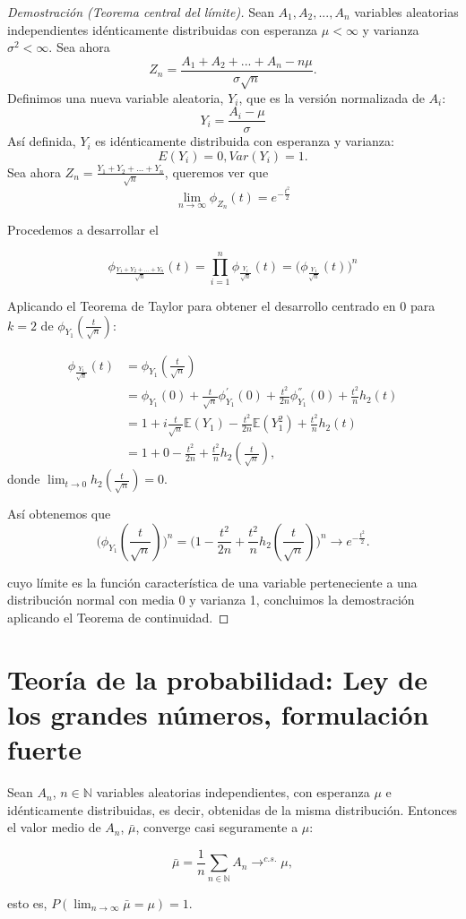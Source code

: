 \documentclass[../proyecto.tex]{memoir}
\begin{document}
\begin{proof}[Demostración (Teorema central del límite)]

Sean $A_{1},A_{2},...,A_{n}$ variables aleatorias independientes idénticamente distribuidas con esperanza $\mu < \infty$ y varianza $\sigma^2< \infty$.
Sea ahora $$
Z_{n} = \frac{A_{1}+A_{2}+...+A_{n}-n\mu }{\sigma \sqrt{n}}.
$$
Definimos una nueva variable aleatoria, $Y_i$, que es la versión normalizada de $A_i$:$$
Y_i=\frac{A_i-\mu}{\sigma}
$$
Así definida, $Y_i$ es idénticamente distribuida con esperanza y varianza: $$
E(Y_{i}) = 0,  Var(Y_{i})=1.
$$
Sea ahora $Z_n = \frac{Y_1+Y_2+...+Y_n}{\sqrt{n}}$, queremos ver que $$
\lim_{n \to \infty} \phi_{Z_{n}}(t)=e^{-\frac{t^{2}}{2}}
$$

Procedemos a desarrollar el

$$
\phi_{\frac{Y_1+Y_2+...+Y_n}{\sqrt{n}}}(t) = \prod_{i=1}^{n} \phi_{\frac{Y_i}{\sqrt{n}}} (t) = \big(\phi_{\frac{Y_1}{\sqrt{n}}}(t) \big)^n
$$

Aplicando el Teorema de Taylor para obtener el desarrollo centrado en 0 para $k=2$ de $\phi_{Y_1}(\frac{t}{\sqrt{n}})$: 

\begin{align*}
\phi_{\frac{Y_1}{\sqrt{n}}}(t) &= \phi_{Y_1}(\frac{t}{\sqrt{n}}) \\
  &= \phi_{Y_1}(0) + \frac{t}{\sqrt{n}}\phi_{Y_1}^{'}(0) + \frac{t^2}{2n}\phi_{Y_1}^{''}(0) + \frac{t^2}{n} h_2(t)\\
 &= 1 + i\frac{t}{\sqrt{n}}\mathds{E}(Y_1) - \frac{t^2}{2n}\mathds{E}(Y_1^2) + \frac{t^2}{n} h_2(t)\\
 &= 1 + 0 - \frac{t^2}{2n} + \frac{t^2}{n} h_2(\frac{t}{\sqrt{n}}),
\end{align*}
donde $\lim_{t\to 0} h_2(\frac{t}{\sqrt{n}}) = 0$.

Así obtenemos que $$
\big(\phi_{Y_1}(\frac{t}{\sqrt{n}}) \big)^n =\big( 1 - \frac{t^2}{2n} + \frac{t^2}{n} h_2(\frac{t}{\sqrt{n}}) \big)^n\longrightarrow e^{-\frac{t^2}{2}}.
$$

cuyo límite es la función característica de una variable perteneciente a una distribución normal con media 0 y varianza 1, concluimos la demostración aplicando el Teorema de continuidad.
\end{proof}

\section{Teoría de la probabilidad: Ley de los grandes números, formulación fuerte}
\begin{teorema}
Sean $A_n$, $n \in \mathds{N}$ variables aleatorias independientes, con esperanza $\mu$ e idénticamente distribuidas, es decir, obtenidas de la misma distribución. Entonces el valor medio de $A_n$, $\bar{\mu}$, converge casi seguramente a $\mu$:

$$
\bar{\mu}=\frac{1}{n}\sum_{n\in\mathds{N}} A_n \to^{c.s.} \mu,
$$

esto es, $P(\lim_{n\to\infty} \bar{\mu}=\mu) = 1$.

\end{teorema}
\end{document}
